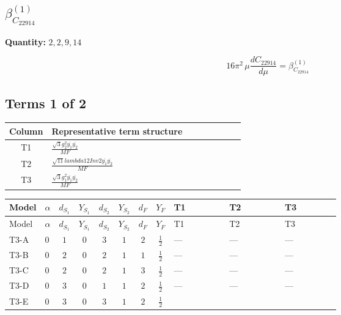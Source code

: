 \documentclass[8pt]{article}
\begin{document}
\begin{landscape}
\section*{$\beta_{C_{22914}}^{(1)}$}
\noindent\textbf{Quantity: }$\mathrm{2,2,9,14}$\par\smallskip
\[16\pi^2\,\mu\frac{d C_{22914}}{d\mu}=\beta_{C_{22914}}^{(1)}\]
\subsection*{Terms 1 of 2}
\begin{center}
\begin{tabular}{@{}c >{\raggedright\arraybackslash}p{0.82\linewidth}@{}}
\toprule
Column & Representative term structure \\
\midrule
T1 & \(\displaystyle \frac{\sqrt{3} g_{2}^{2} \overline{y_{1}} \overline{y_{2}}}{MF}\) \\
\midrule
T2 & \(\displaystyle \frac{\sqrt{11} lambda12Inv2 \overline{y_{1}} \overline{y_{2}}}{MF}\) \\
\midrule
T3 & \(\displaystyle \frac{\sqrt{3} g_{1}^{2} \overline{y_{1}} \overline{y_{2}}}{MF}\) \\
\midrule
\bottomrule
\end{tabular}
\end{center}
\smallskip
\tiny
\begin{longtable}{@{}llcccccc >{\raggedright\arraybackslash}p{0.21\linewidth} >{\raggedright\arraybackslash}p{0.21\linewidth} >{\raggedright\arraybackslash}p{0.21\linewidth}@{}}
\toprule
Model & $\alpha$ & $d_{S_1}$ & $Y_{S_1}$ & $d_{S_2}$ & $Y_{S_2}$ & $d_F$ & $Y_F$ & T1 & T2 & T3 \\
\midrule
\endfirsthead
\toprule
Model & $\alpha$ & $d_{S_1}$ & $Y_{S_1}$ & $d_{S_2}$ & $Y_{S_2}$ & $d_F$ & $Y_F$ & T1 & T2 & T3 \\
\midrule
\endhead
T3-A & $0$ & $1$ & $0$ & $3$ & $1$ & $2$ & $\frac{1}{2}$ & --- & --- & --- \\
\midrule
T3-B & $0$ & $2$ & $0$ & $2$ & $1$ & $1$ & $\frac{1}{2}$ & --- & --- & --- \\
\midrule
T3-C & $0$ & $2$ & $0$ & $2$ & $1$ & $3$ & $\frac{1}{2}$ & --- & --- & --- \\
\midrule
T3-D & $0$ & $3$ & $0$ & $1$ & $1$ & $2$ & $\frac{1}{2}$ & --- & --- & --- \\
\midrule
T3-E & $0$ & $3$ & $0$ & $3$ & $1$ & $2$ & $\frac{1}{2}$ & \scriptsize\adjustbox{max width=\linewidth}{$\begin{gathered} - \frac{11 \sqrt{3} g_{2}^{2} \overline{y_{1}} \overline{y_{2}}}{8 MF}\end{gathered}$} & \scriptsize\adjustbox{max width=\linewidth}{$\begin{gathered} - \frac{3 \sqrt{11} lambda12Inv2 \overline{y_{1}} \overline{y_{2}}}{22 MF}\end{gathered}$} & \scriptsize\adjustbox{max width=\linewidth}{$\begin{gathered} - \frac{\sqrt{3} g_{1}^{2} \overline{y_{1}} \overline{y_{2}}}{8 MF}\end{gathered}$} \\

\end{longtable}
\end{landscape}
\end{document}
